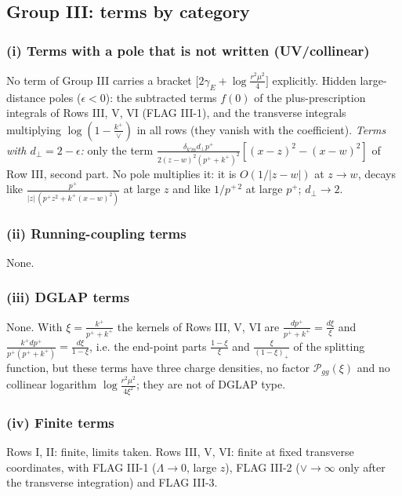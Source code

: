 \documentclass[9pt]{article}
\numberwithin{equation}{section}
\begin{document}
\subsection{Group III: terms by category}
\subsubsection{(i) Terms with a pole that is not written (UV/collinear)}
\noindent No term of Group III carries a bracket $\big[2\gamma_{E}+\log\frac{r^{2}\mu^{2}}{4}\big]$ explicitly. Hidden large-distance poles ($\epsilon<0$): the subtracted terms $f(0)$ of the plus-prescription integrals of Rows III, V, VI (FLAG III-1), and the transverse integrals multiplying $\log(1-\frac{k^{+}}{\vee})$ in all rows (they vanish with the coefficient). \emph{Terms with $d_{\perp}=2-\epsilon$:} only the term $\frac{\delta_{k'm}d_{\perp}p^{+}}{2(z-w)^{2}(p^{+}+k^{+})^{2}}[(x-z)^{2}-(x-w)^{2}]$ of Row III, second part. No pole multiplies it: it is $O(1/|z-w|)$ at $z\to w$, decays like $\frac{p^{+}}{|z|\,(p^{+}z^{2}+k^{+}(x-w)^{2})}$ at large $z$ and like $1/p^{+\,2}$ at large $p^{+}$; $d_{\perp}\to2$.
\subsubsection{(ii) Running-coupling terms}
\noindent None.
\subsubsection{(iii) DGLAP terms}
\noindent None. With $\xi=\frac{k^{+}}{p^{+}+k^{+}}$ the kernels of Rows III, V, VI are $\frac{dp^{+}}{p^{+}+k^{+}}=\frac{d\xi}{\xi}$ and $\frac{k^{+}dp^{+}}{p^{+}(p^{+}+k^{+})}=\frac{d\xi}{1-\xi}$, i.e. the end-point parts $\frac{1-\xi}{\xi}$ and $\frac{\xi}{(1-\xi)_{+}}$ of the splitting function, but these terms have three charge densities, no factor $\mathcal P_{gg}(\xi)$ and no collinear logarithm $\log\frac{r^{2}\mu^{2}}{4\xi^{2}}$; they are not of DGLAP type.
\subsubsection{(iv) Finite terms}
\noindent Rows I, II: finite, limits taken. Rows III, V, VI: finite at fixed transverse coordinates, with FLAG III-1 ($\Lambda\to0$, large $z$), FLAG III-2 ($\vee\to\infty$ only after the transverse integration) and FLAG III-3.
\end{document}
